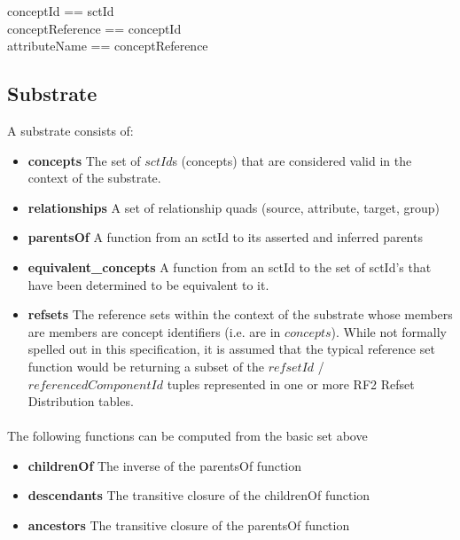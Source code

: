 \documentclass{article}
\begin{document}
\begin{zed}
conceptId == sctId \\
conceptReference == conceptId \cross \optional[term] \\
attributeName == conceptReference
\end{zed}

\subsection{Substrate}
A substrate consists of:

\begin{itemize}[noitemsep,nolistsep]
\item{\textbf{concepts}} The set of $sctId$s (concepts) that are considered valid in the context of the substrate.  
\item{\textbf{relationships}} A set of relationship quads (source, attribute, target, group)
\item{\textbf{parentsOf}}  A function from an sctId to its asserted and inferred parents
\item{\textbf{equivalent\_concepts}} A function from an sctId to the set of sctId's that have been determined to be equivalent to it. 
 \item{\textbf{refsets}} The reference sets within the context of the substrate whose members are members are concept identifiers (i.e. are in $concepts$).  While not formally spelled out in this specification, it is assumed that the typical reference set function would be returning a subset of the $refsetId$ / $referencedComponentId$ tuples represented in one or more RF2 Refset Distribution tables.
\end{itemize}
\paragraph{}

The following functions can be computed from the basic set above
\begin{itemize}[noitemsep,nolistsep]
\item{\textbf{childrenOf}} The inverse of the parentsOf function
\item{\textbf{descendants}} The transitive closure of the childrenOf function
\item{\textbf{ancestors}} The transitive closure of the parentsOf function
\end{itemize}

\paragraph{}
\end{document}
